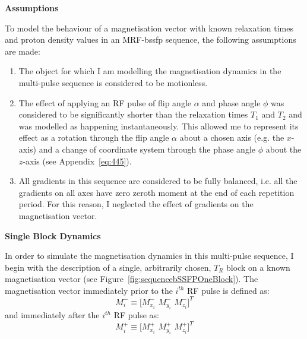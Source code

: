 \hfill

\large \textbf{Assumptions} \normalsize

To model the behaviour of a magnetisation vector with known relaxation times and proton density values in an MRF-\ac{bssfp} sequence, the following assumptions are made:

\begin{enumerate}
    \item The object for which I am modelling the magnetisation dynamics in the multi-pulse sequence is considered to be motionless.

    \item The effect of applying an RF pulse of flip angle $\alpha$ and phase angle $\phi$ was considered to be significantly shorter than the relaxation times $T_1$ and $T_2$ and was modelled as happening instantaneously.
    This allowed me to represent its effect as a rotation through the flip angle $\alpha$ about a chosen axis (e.g. the $x$-axis) and a change of coordinate system through the phase angle $\phi$ about the $z$-axis (see Appendix~\ref{eq:445}).
    
    \item All gradients in this sequence are considered to be fully balanced, i.e. all the gradients on all axes have zero zeroth moment at the end of each repetition period.
    For this reason, I neglected the effect of gradients on the magnetisation vector.

\end{enumerate}

\clearpage

\large \textbf{Single Block Dynamics} \normalsize

In order to simulate the magnetisation dynamics in this multi-pulse sequence, 
I begin with the description of a single, arbitrarily chosen, $T_R$ block on a known magnetisation vector (see Figure~\ref{fig:sequencebSSFPOneBlock}).
The magnetisation vector immediately prior to the $i^{th}$ RF pulse is defined as:
\begin{equation}
    M^{-}_i \equiv \big[ M^-_{x_i} \, \,  M^-_{y_i} \, \, M^-_{z_i} \big]^T
\end{equation}
and immediately after the $i^{th}$ RF pulse as:
\begin{equation}
    M^{+}_i \equiv \big[ M^+_{x_i} \, \,  M^+_{y_i} \, \, M^+_{z_i} \big]^T
\end{equation}

